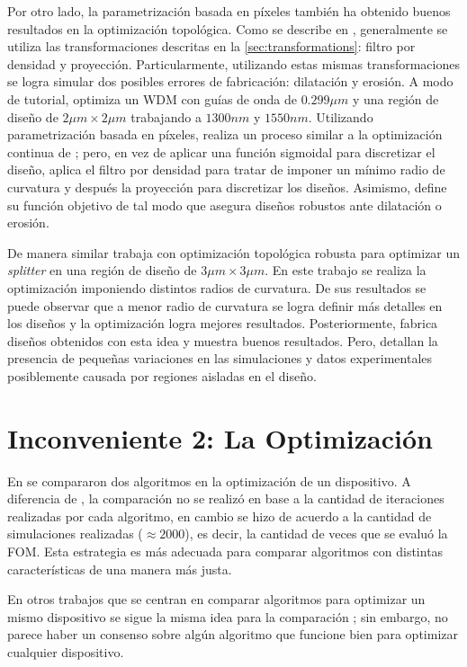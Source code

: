 Por otro lado, la parametrización basada en píxeles también ha obtenido buenos resultados en
la optimización topológica.
Como se describe en \cite{Lazarov2016}, generalmente se utiliza las transformaciones 
descritas en la \autoref{sec:transformations}:
filtro por densidad y proyección. Particularmente, utilizando estas mismas transformaciones
se logra simular dos posibles errores de fabricación: dilatación y erosión.
A modo de tutorial, \cite{Christiansen2021} optimiza un WDM con guías de onda de $0.299 \mu m$ y
una región de diseño de $2 \mu m \times 2 \mu m$ trabajando a $1300 nm$ y $1550 nm$.
Utilizando parametrización basada en píxeles, 
realiza un proceso similar a la optimización continua de \cite{Su2020}; 
pero, en vez de aplicar una función sigmoidal para 
discretizar el diseño, aplica el filtro por densidad para tratar de imponer un mínimo radio de curvatura
y después la proyección para discretizar los diseños. 
Asimismo, define su función objetivo de tal modo que asegura
diseños robustos ante dilatación o erosión.


De manera similar \cite{Hammond20} trabaja con optimización topológica robusta para optimizar un 
\emph{splitter} en una región de diseño de $3 \mu m \times 3 \mu m$.
En este trabajo se realiza la optimización imponiendo distintos radios de curvatura.
De sus resultados se puede observar que a menor radio de curvatura se logra definir más detalles en los
diseños y la optimización logra mejores resultados.
Posteriormente, \cite{Hammond21} fabrica diseños obtenidos con esta idea y muestra buenos resultados. 
Pero, detallan la presencia de pequeñas variaciones en las simulaciones y datos experimentales
posiblemente causada por regiones aisladas en el diseño.

\section{Inconveniente 2: La Optimización}

En \cite{Malheiros-Silveira2020} se compararon dos algoritmos en la optimización de un dispositivo.
A diferencia de \cite{Prosopio-Galarza2019}, la comparación no se realizó en base a la cantidad de iteraciones
realizadas por cada algoritmo, en cambio se hizo de acuerdo a la cantidad de simulaciones realizadas 
($\approx 2000$), es decir, la cantidad de veces que se evaluó la FOM.
Esta estrategia es más adecuada para comparar algoritmos con distintas características de una manera más justa.


En otros trabajos que se centran en comparar algoritmos para optimizar un mismo dispositivo se sigue la misma
idea para la comparación \citep{Schneider2019, Gregory2015}; sin embargo, no parece haber un consenso sobre algún algoritmo que funcione bien
para optimizar cualquier dispositivo.


